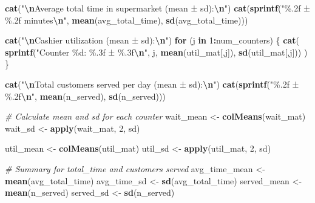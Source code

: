 \documentclass[
]{article}
\newenvironment{Shaded}{\begin{snugshade}}{\end{snugshade}}
\newcommand{\CommentTok}[1]{\textcolor[rgb]{0.56,0.35,0.01}{\textit{#1}}}
\newcommand{\ControlFlowTok}[1]{\textcolor[rgb]{0.13,0.29,0.53}{\textbf{#1}}}
\newcommand{\DecValTok}[1]{\textcolor[rgb]{0.00,0.00,0.81}{#1}}
\newcommand{\FunctionTok}[1]{\textcolor[rgb]{0.13,0.29,0.53}{\textbf{#1}}}
\newcommand{\NormalTok}[1]{#1}
\newcommand{\OtherTok}[1]{\textcolor[rgb]{0.56,0.35,0.01}{#1}}
\newcommand{\SpecialCharTok}[1]{\textcolor[rgb]{0.81,0.36,0.00}{\textbf{#1}}}
\newcommand{\StringTok}[1]{\textcolor[rgb]{0.31,0.60,0.02}{#1}}
\begin{document}
\begin{Shaded}
\begin{Highlighting}[]
\FunctionTok{cat}\NormalTok{(}\StringTok{"}\SpecialCharTok{\textbackslash{}n}\StringTok{Average total time in supermarket (mean ± sd):}\SpecialCharTok{\textbackslash{}n}\StringTok{"}\NormalTok{)}
\FunctionTok{cat}\NormalTok{(}\FunctionTok{sprintf}\NormalTok{(}\StringTok{"\%.2f ± \%.2f minutes}\SpecialCharTok{\textbackslash{}n}\StringTok{"}\NormalTok{, }\FunctionTok{mean}\NormalTok{(avg\_total\_time), }\FunctionTok{sd}\NormalTok{(avg\_total\_time)))}

\FunctionTok{cat}\NormalTok{(}\StringTok{"}\SpecialCharTok{\textbackslash{}n}\StringTok{Cashier utilization (mean ± sd):}\SpecialCharTok{\textbackslash{}n}\StringTok{"}\NormalTok{)}
\ControlFlowTok{for}\NormalTok{ (j }\ControlFlowTok{in} \DecValTok{1}\SpecialCharTok{:}\NormalTok{num\_counters) \{}
  \FunctionTok{cat}\NormalTok{(}
    \FunctionTok{sprintf}\NormalTok{(}\StringTok{"Counter \%d: \%.3f ± \%.3f}\SpecialCharTok{\textbackslash{}n}\StringTok{"}\NormalTok{, }
\NormalTok{            j, }\FunctionTok{mean}\NormalTok{(util\_mat[,j]), }\FunctionTok{sd}\NormalTok{(util\_mat[,j]))}
\NormalTok{  )}
\NormalTok{\}}

\FunctionTok{cat}\NormalTok{(}\StringTok{"}\SpecialCharTok{\textbackslash{}n}\StringTok{Total customers served per day (mean ± sd):}\SpecialCharTok{\textbackslash{}n}\StringTok{"}\NormalTok{)}
\FunctionTok{cat}\NormalTok{(}\FunctionTok{sprintf}\NormalTok{(}\StringTok{"\%.2f ± \%.2f}\SpecialCharTok{\textbackslash{}n}\StringTok{"}\NormalTok{, }\FunctionTok{mean}\NormalTok{(n\_served), }\FunctionTok{sd}\NormalTok{(n\_served)))}


\CommentTok{\# Calculate mean and sd for each counter}
\NormalTok{wait\_mean }\OtherTok{\textless{}{-}} \FunctionTok{colMeans}\NormalTok{(wait\_mat)}
\NormalTok{wait\_sd }\OtherTok{\textless{}{-}} \FunctionTok{apply}\NormalTok{(wait\_mat, }\DecValTok{2}\NormalTok{, sd)}

\NormalTok{util\_mean }\OtherTok{\textless{}{-}} \FunctionTok{colMeans}\NormalTok{(util\_mat)}
\NormalTok{util\_sd }\OtherTok{\textless{}{-}} \FunctionTok{apply}\NormalTok{(util\_mat, }\DecValTok{2}\NormalTok{, sd)}

\CommentTok{\# Summary for total\_time and customers served}
\NormalTok{avg\_time\_mean }\OtherTok{\textless{}{-}} \FunctionTok{mean}\NormalTok{(avg\_total\_time)}
\NormalTok{avg\_time\_sd }\OtherTok{\textless{}{-}} \FunctionTok{sd}\NormalTok{(avg\_total\_time)}
\NormalTok{served\_mean }\OtherTok{\textless{}{-}} \FunctionTok{mean}\NormalTok{(n\_served)}
\NormalTok{served\_sd }\OtherTok{\textless{}{-}} \FunctionTok{sd}\NormalTok{(n\_served)}


\end{Highlighting}
\end{Shaded}
\end{document}
